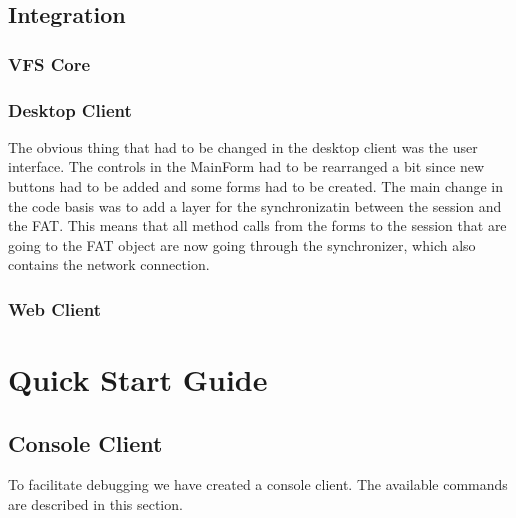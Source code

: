 \documentclass[a4paper,12pt]{article}
\begin{document}
\subsection{Integration}

\subsubsection{VFS Core}

\subsubsection{Desktop Client}
The obvious thing that had to be changed in the desktop client was the user interface. The controls in the MainForm had to be rearranged a bit since new buttons had to be added and some forms had to be created. The main change in the code basis was to add a layer for the synchronizatin between the session and the FAT. This means that all method calls from the forms to the session that are going to the FAT object are now going through the synchronizer, which also contains the network connection. 

\subsubsection{Web Client}




\section{Quick Start Guide}

\subsection{Console Client}
To facilitate debugging we have created a console client. The available commands are described in this section.
\end{document}
